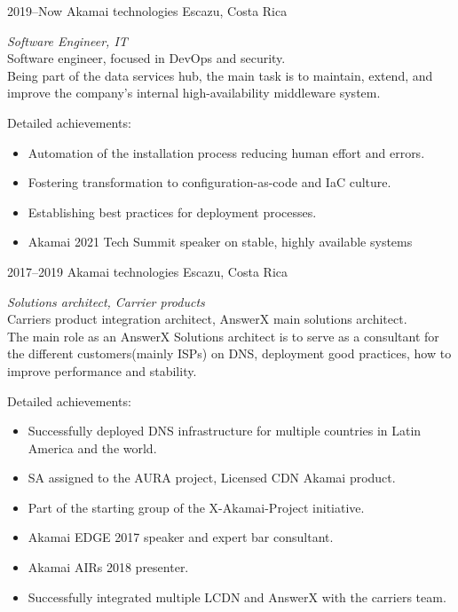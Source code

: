 \documentclass[]{friggeri-cv}
\begin{document}
\begin{entrylist}

\entry
{2019--Now}
{Akamai technologies}
{Escazu, Costa Rica}
{\emph{Software Engineer, IT} \\
Software engineer, focused in DevOps and security.\\

Being part of the data services hub, the main task is to maintain, extend, and improve the company's internal high-availability middleware system.

Detailed achievements:
\begin{itemize}
		\item Automation of the installation process reducing human effort and errors.
		\item Fostering transformation to configuration-as-code and IaC culture.
		\item Establishing best practices for deployment processes.
		\item Akamai 2021 Tech Summit speaker on stable,  highly available systems
\end{itemize}
}

\entry
{2017--2019}
{Akamai technologies}
{Escazu, Costa Rica}
{\emph{Solutions architect, Carrier products} \\
Carriers product integration architect, AnswerX main solutions architect.\\
The main role as an AnswerX Solutions architect is to serve as a consultant for the different customers(mainly ISPs) on DNS, deployment good practices, how to improve performance and stability.

Detailed achievements:
\begin{itemize}
        \item Successfully deployed DNS infrastructure for multiple countries in Latin America and the world.
        \item SA assigned to the AURA project, Licensed CDN Akamai product.
        \item Part of the starting group of the X-Akamai-Project initiative.
        \item Akamai EDGE 2017 speaker and expert bar consultant.
        \item Akamai AIRs 2018 presenter.
        \item Successfully integrated multiple LCDN and AnswerX with the carriers team.
\end{itemize}
}

\end{entrylist}
\end{document}
